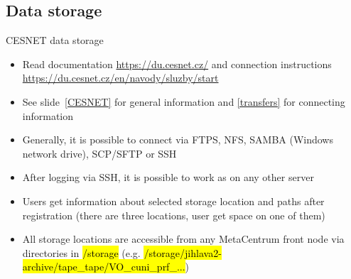 \documentclass[compress, ucs, xelatex, 11pt, xcolor=svgnames,
  hyperref={
    bookmarks=true,
    unicode=true,
    colorlinks=true,
    pdftitle={Linux, command line and MetaCentrum},
    plainpages=false,
    pdfauthor={Vojtech Zeisek},
    pdfsubject={Course about use of Linux command line, writing shell scripts and using MetaCentrum of CESNET},
    pdfcreator={XeLaTeX},
    pdfkeywords={Linux, GNU, BASH, shell, command line, MetaCentrum},
    linkcolor=DarkRed,
    anchorcolor=DarkBlue,
    citecolor=Indigo,
    filecolor=NavyBlue,
    menucolor=DarkMagenta,
    urlcolor=DarkBlue,
    pdftex},
  url={hyphens, lowtilde} %
  ]{beamer}
\renewcommand{\texttt}[1]{\hl{\ttfamily #1}}
\begin{document}
\subsection{Data storage}

\begin{frame}{CESNET data storage}
  \begin{itemize}
    \item Read documentation \url{https://du.cesnet.cz/} and connection instructions \url{https://du.cesnet.cz/en/navody/sluzby/start}
    \item See slide~\ref{CESNET} for general information and \ref{transfers} for connecting information
    \item Generally, it is possible to connect via FTPS, NFS, SAMBA (Windows network drive), SCP/SFTP or SSH
    \item After logging via SSH, it is possible to work as on any other server
    \item Users get information about selected storage location and paths after registration (there are three locations, user get space on one of them)
    \item All storage locations are accessible from any MetaCentrum front node via directories in \texttt{/storage} (e.g. \texttt{/storage/jihlava2-archive/tape\_tape/VO\_cuni\_prf\_...})
  \end{itemize}
\end{frame}
\end{document}
